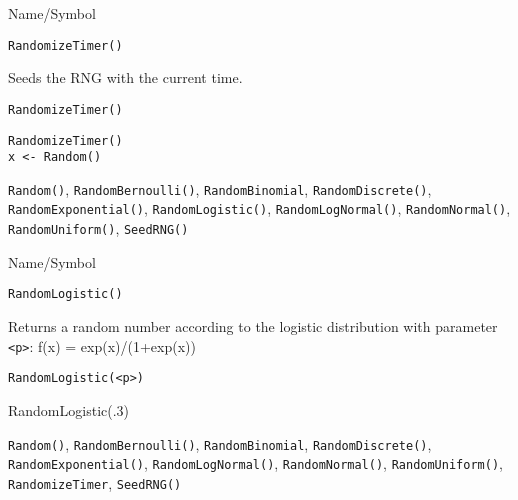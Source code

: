 \begin{desc}{Name/Symbol}
\item[Name/Symbol]	\verb+RandomizeTimer()+

\item[Description]	Seeds the RNG with the current time.

\item[Usage]
\begin{verbatim}
RandomizeTimer()
\end{verbatim}

\item[Example]	
\begin{verbatim}
RandomizeTimer()
x <- Random()
\end{verbatim}
	     
\item[See Also]	\verb+Random()+, \verb+RandomBernoulli()+, \verb+RandomBinomial+,
		\verb+RandomDiscrete()+, \verb+RandomExponential()+, \verb+RandomLogistic()+,
		\verb+RandomLogNormal()+, \verb+RandomNormal()+, \verb+RandomUniform()+, \verb+SeedRNG()+
\end{desc}

\begin{desc}{Name/Symbol}
\item[Name/Symbol]	\verb+RandomLogistic()+  

\item[Description]	Returns a random number according to the logistic distribution 
		with parameter \verb+<p>+: f(x) = exp(x)/(1+exp(x))

\item[Usage]		
\begin{verbatim}
RandomLogistic(<p>)
\end{verbatim}

\item[Example]	RandomLogistic(.3)

\item[See Also]	\verb+Random()+, \verb+RandomBernoulli()+, \verb+RandomBinomial+, 
		\verb+RandomDiscrete()+, \verb+RandomExponential()+, \verb+RandomLogNormal()+, 
		\verb+RandomNormal()+, \verb+RandomUniform()+, \verb+RandomizeTimer+, \verb+SeedRNG()+
\end{desc}

